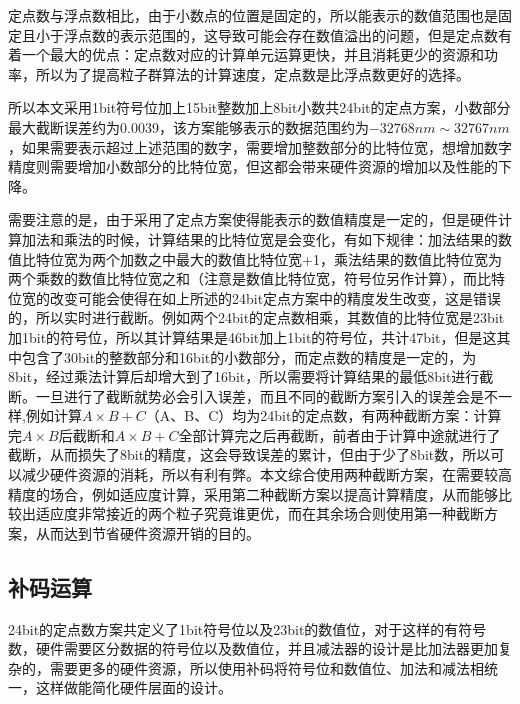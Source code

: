 定点数与浮点数相比，由于小数点的位置是固定的，所以能表示的数值范围也是固定且小于浮点数的表示范围的，这导致可能会存在数值溢出的问题，但是定点数有着一个最大的优点：定点数对应的计算单元运算更快，并且消耗更少的资源和功率，所以为了提高粒子群算法的计算速度，定点数是比浮点数更好的选择。

所以本文采用1bit符号位加上15bit整数加上8bit小数共24bit的定点方案，小数部分最大截断误差约为0.0039，该方案能够表示的数据范围约为$-32768nm\sim32767nm$，如果需要表示超过上述范围的数字，需要增加整数部分的比特位宽，想增加数字精度则需要增加小数部分的比特位宽，但这都会带来硬件资源的增加以及性能的下降。

需要注意的是，由于采用了定点方案使得能表示的数值精度是一定的，但是硬件计算加法和乘法的时候，计算结果的比特位宽是会变化，有如下规律：加法结果的数值比特位宽为两个加数之中最大的数值比特位宽+1，乘法结果的数值比特位宽为两个乘数的数值比特位宽之和（注意是数值比特位宽，符号位另作计算），而比特位宽的改变可能会使得在如上所述的24bit定点方案中的精度发生改变，这是错误的，所以实时进行截断。例如两个24bit的定点数相乘，其数值的比特位宽是23bit加1bit的符号位，所以其计算结果是46bit加上1bit的符号位，共计47bit，但是这其中包含了30bit的整数部分和16bit的小数部分，而定点数的精度是一定的，为8bit，经过乘法计算后却增大到了16bit，所以需要将计算结果的最低8bit进行截断。一旦进行了截断就势必会引入误差，而且不同的截断方案引入的误差会是不一样,例如计算$A\times B+C$（A、B、C）均为24bit的定点数，有两种截断方案：计算完$A\times B$后截断和$A\times B+C$全部计算完之后再截断，前者由于计算中途就进行了截断，从而损失了8bit的精度，这会导致误差的累计，但由于少了8bit数，所以可以减少硬件资源的消耗，所以有利有弊。本文综合使用两种截断方案，在需要较高精度的场合，例如适应度计算，采用第二种截断方案以提高计算精度，从而能够比较出适应度非常接近的两个粒子究竟谁更优，而在其余场合则使用第一种截断方案，从而达到节省硬件资源开销的目的。

\subsection{补码运算}
24bit的定点数方案共定义了1bit符号位以及23bit的数值位，对于这样的有符号数，硬件需要区分数据的符号位以及数值位，并且减法器的设计是比加法器更加复杂的，需要更多的硬件资源，所以使用补码将符号位和数值位、加法和减法相统一，这样做能简化硬件层面的设计。

